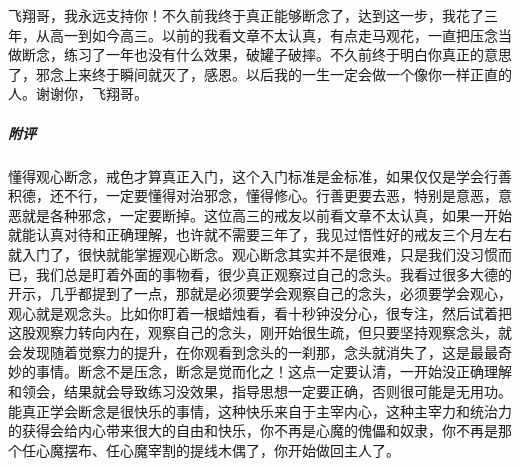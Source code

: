 \begin{case}
    飞翔哥，我永远支持你！不久前我终于真正能够断念了，达到这一步，我花了三年，从高一到如今高三。以前的我看文章不太认真，有点走马观花，一直把压念当做断念，练习了一年也没有什么效果，破罐子破摔。不久前终于明白你真正的意思了，邪念上来终于瞬间就灭了，感恩。以后我的一生一定会做一个像你一样正直的人。谢谢你，飞翔哥。
    \subparagraph{附评} 懂得观心断念，戒色才算真正入门，这个入门标准是金标准，如果仅仅是学会行善积德，还不行，一定要懂得对治邪念，懂得修心。行善更要去恶，特别是意恶，意恶就是各种邪念，一定要断掉。这位高三的戒友以前看文章不太认真，如果一开始就能认真对待和正确理解，也许就不需要三年了，我见过悟性好的戒友三个月左右就入门了，很快就能掌握观心断念。观心断念其实并不是很难，只是我们没习惯而已，我们总是盯着外面的事物看，很少真正观察过自己的念头。我看过很多大德的开示，几乎都提到了一点，那就是必须要学会观察自己的念头，必须要学会观心，观心就是观念头。比如你盯着一根蜡烛看，看十秒钟没分心，很专注，然后试着把这股观察力转向内在，观察自己的念头，刚开始很生疏，但只要坚持观察念头，就会发现随着觉察力的提升，在你观看到念头的一刹那，念头就消失了，这是最最奇妙的事情。断念不是压念，断念是觉而化之！这点一定要认清，一开始没正确理解和领会，结果就会导致练习没效果，指导思想一定要正确，否则很可能是无用功。能真正学会断念是很快乐的事情，这种快乐来自于主宰内心，这种主宰力和统治力的获得会给内心带来很大的自由和快乐，你不再是心魔的傀儡和奴隶，你不再是那个任心魔摆布、任心魔宰割的提线木偶了，你开始做回主人了。
\end{case}

